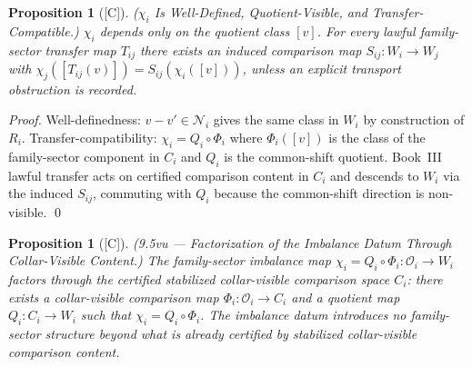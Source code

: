 \documentclass[12pt,oneside]{amsbook}
\theoremstyle{plain}
\newtheorem{proposition}[theorem]{Proposition}
\theoremstyle{definition}
\theoremstyle{remark}
\newcommand{\status}[1]{\textup{[#1]}}
\begin{document}
\begin{proposition}[\status{C}]\label{prop:chi-well-defined}
\textup{($\chi_i$ Is Well-Defined, Quotient-Visible, and Transfer-Compatible.)}
$\chi_i$ depends only on the quotient class $[v]$.
For every lawful family-sector transfer map $T_{ij}$ there exists an
induced comparison map $S_{ij}:W_i \to W_j$ with
$\chi_j([T_{ij}(v)]) = S_{ij}(\chi_i([v]))$, unless an explicit
transport obstruction is recorded.
\end{proposition}

\begin{proof}
Well-definedness: $v - v' \in \mathcal{N}_i$ gives the same class in
$W_i$ by construction of $R_i$.  Transfer-compatibility: $\chi_i =
Q_i \circ \Phi_i$ where $\Phi_i([v])$ is the class of the
family-sector component in $C_i$ and $Q_i$ is the common-shift
quotient.  Book~III lawful transfer acts on certified comparison
content in $C_i$ and descends to $W_i$ via the induced $S_{ij}$,
commuting with $Q_i$ because the common-shift direction is
non-visible. \qed
\end{proof}


\begin{proposition}[\status{C}]\label{prop:chi-factors-vu}
\textup{(9.5vu --- Factorization of the Imbalance Datum Through Collar-Visible Content.)}
The family-sector imbalance map
$\chi_i = Q_i \circ \Phi_i : \mathcal{O}_i \to W_i$
factors through the certified stabilized collar-visible comparison
space $C_i$: there exists a collar-visible comparison map
$\Phi_i : \mathcal{O}_i \to C_i$ and a quotient map
$Q_i : C_i \to W_i$ such that $\chi_i = Q_i \circ \Phi_i$.
The imbalance datum introduces no family-sector structure beyond
what is already certified by stabilized collar-visible comparison
content.
\end{proposition}
\end{document}
